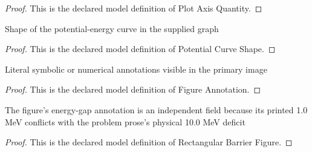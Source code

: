\begin{proof}
  This is the declared model definition of Plot Axis Quantity.
\end{proof}
\begin{definition}
  \label{def:physics:phyx-mini-0615:phyxminiproblems-problemphyxmini0615-potentialcurveshape}
  Shape of the potential-energy curve in the supplied graph
\end{definition}
\begin{proof}
  This is the declared model definition of Potential Curve Shape.
\end{proof}
\begin{definition}
  \label{def:physics:phyx-mini-0615:phyxminiproblems-problemphyxmini0615-figureannotation}
  Literal symbolic or numerical annotations visible in the primary image
\end{definition}
\begin{proof}
  This is the declared model definition of Figure Annotation.
\end{proof}
\begin{definition}
  \label{def:physics:phyx-mini-0615:phyxminiproblems-problemphyxmini0615-rectangularbarrierfigure}
  The figure's energy-gap annotation is an independent field because its printed 1.0 MeV conflicts with the problem prose's physical 10.0 MeV deficit
\end{definition}
\begin{proof}
  This is the declared model definition of Rectangular Barrier Figure.
\end{proof}

